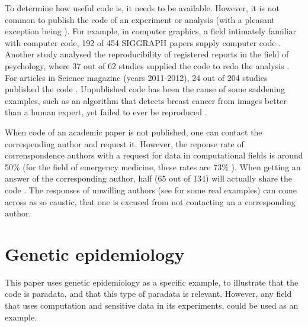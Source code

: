 To determine how useful code is, it needs to be available.
However, it is not common to publish the code of an experiment or analysis 
\cite{stodden2011trust,read2015sizing} (with a pleasant exception 
being \cite{conesa2019making}).
For example, in computer graphics, 
a field intimately familiar with computer code,
192 of 454 SIGGRAPH papers supply computer code \cite{bonneel2020code}.
Another study analysed the reproducibility of registered reports
in the field of psychology, 
where 37 out of 62 studies supplied the code 
to redo the analysis \cite{obels2020analysis}.
For articles in Science magazine (years 2011-2012), 24 out of 204
studies published the code \cite{stodden2018empirical}.
Unpublished code has been the cause of some saddening examples,
such as an algorithm that detects breast cancer from images 
better than a human expert, 
yet failed to ever be reproduced \cite{haibe2020importance}.


When code of an academic paper is not published, 
one can contact the correspending author and request it.
However, the reponse rate of correnspondence authors 
with a request for data in computational fields is around 50\% 
\cite{manca2018non, stodden2018empirical, teunis2015corresponding} 
(for the field of emergency medicine, these rates are 73\% \cite{o2003email}).
When getting an answer of the corresponding author, 
half (65 out of 134) will actually share the code \cite{stodden2018empirical}.
The responses of unwilling authors (see \cite{stodden2018empirical} for 
some real examples) can come across as so caustic, 
that one is excused from not contacting an a corresponding author.

\section{Genetic epidemiology}


This paper uses genetic epidemiology as a specific example,
to illustrate that the code is paradata,
and that this type of paradata is relevant.
However, any field that uses computation 
and sensitive data in its experiments,
could be used as an example.

